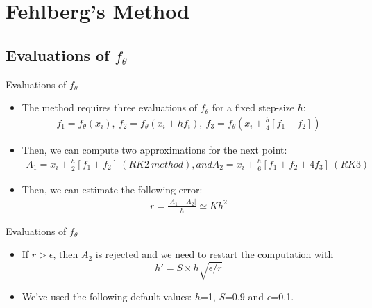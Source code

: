 \documentclass{EESD}
\begin{document}

\section{Fehlberg's Method}

\subsection{Evaluations of $f_{\theta}$}
\begin{frame}[t]{Evaluations of $f_{\theta}$}
\begin{itemize}
    \item The method requires three evaluations of $f_{\theta}$ for a fixed step-size $h$:
    \begin{equation}
        \begin{aligned}
            f_1 = f_\theta(x_i),\ f_2 = f_\theta(x_i + hf_i),\ f_3 = f_\theta(x_i + \frac{h}{4}[f_1 + f_2])
        \end{aligned}
    \end{equation}\pause
    \item Then, we can compute two approximations for the next point:
    \begin{equation}
        \begin{aligned}
            A_1 = x_i + \frac{h}{2}[f_1 +f_2]\ (RK2\ method), and A_2 = x_i + \frac{h}{6}[f_1 + f_2 + 4f_3]\ (RK3)
        \end{aligned}
    \end{equation}\vspace{10pt}\pause
    \item Then, we can estimate the following error:
    \begin{equation}
        \begin{aligned}
            r = \frac{|A_1 - A_2|}{h} \simeq Kh^2
        \end{aligned}
    \end{equation}\vspace{10pt}
\end{itemize}
\end{frame}

\begin{frame}[t]{Evaluations of $f_{\theta}$}
\begin{itemize}
    \item If $r>\epsilon$, then $A_2$ is rejected and we need to restart the computation with \begin{equation}
        h'= S \times h\sqrt{\epsilon/r}
    \end{equation}\pause
    \item We've used the following default values: $h$=1, $S$=0.9 and $\epsilon$=0.1.
\end{itemize}
\end{frame}
\end{document}
